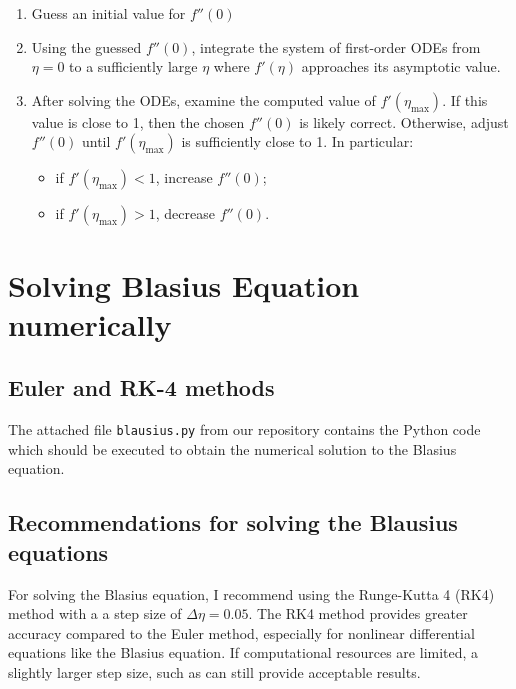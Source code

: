 \documentclass{article}
\begin{document}
\begin{enumerate}
    \item Guess an initial value for \( f''(0) \) 
    
    \item Using the guessed \( f''(0) \), integrate the system of first-order ODEs from \( \eta = 0 \) to a sufficiently 
    large \( \eta \) where \( f'(\eta) \) approaches its asymptotic value.
    
    \item After solving the ODEs, examine the computed value of \( f'(\eta_{\text{max}}) \). If this value is close to 1, then the chosen
     \( f''(0) \) is likely correct. Otherwise, adjust \( f''(0) \) until \( f'(\eta_{\text{max}}) \) is sufficiently close to 1. In particular:
     \begin{itemize}
        \item if \( f'(\eta_{\text{max}}) < 1 \), increase \( f''(0) \);
        \item if \( f'(\eta_{\text{max}}) > 1 \), decrease \( f''(0) \).
    \end{itemize}
   
\end{enumerate}




\section{ Solving Blasius Equation numerically}

\subsection{Euler and RK-4 methods}
The attached file \texttt{blausius.py} from our repository \cite{GitHubRepo} contains the Python code which should be executed to obtain the numerical solution to the Blasius equation.

\subsection{Recommendations for solving the Blausius equations}
For solving the Blasius equation, I recommend using the Runge-Kutta 4 (RK4) method with a a step size of \( \Delta \eta = 0.05 \).
The RK4 method provides greater accuracy compared to the Euler method, especially for nonlinear differential equations like the Blasius equation. 
If computational resources are limited, a slightly larger step size, such as can still provide acceptable results.
\end{document}
